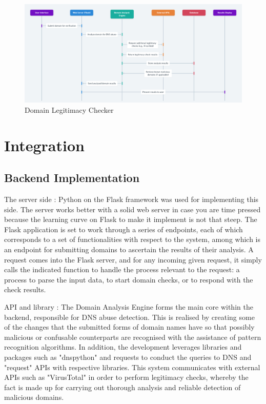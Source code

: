 \begin{figure}[H]
\captionsetup{font= footnotesize}
    \centering
    \includegraphics[width=1\linewidth]{project/DNS Abuse Transparency System.png}
    \caption{Domain Legitimacy Checker}
    \label{fig:figfig}
\end{figure}

\section{Integration} 
\subsection{Backend Implementation}

The server side :   Python on the Flask framework was used for implementing this side. The server works better with a solid web server in case you are time pressed because the learning curve on Flask to make it implement is not that steep. The Flask application is set to work through a series of endpoints, each of which corresponds to a set of functionalities with respect to the system, among which is an endpoint for submitting domains to ascertain the results of their analysis. A request comes into the Flask server, and for any incoming given request, it simply calls the indicated function to handle the process relevant to the request: a process to parse the input data, to start domain checks, or to respond with the check results.

 API and library : The Domain Analysis Engine forms the main core within the backend, responsible for DNS abuse detection. This is realised by creating some of the changes that the submitted forms of domain names have so that possibly malicious or confusable counterparts are recognised with the assistance of pattern recognition algorithms. In addition, the development leverages libraries and packages such as "dnspython" and requests to conduct the queries to DNS and "request" APIs with respective libraries. This system communicates with external APIs such as "VirusTotal" in order to perform legitimacy checks, whereby the fact is made up for carrying out thorough analysis and reliable detection of malicious domains.

